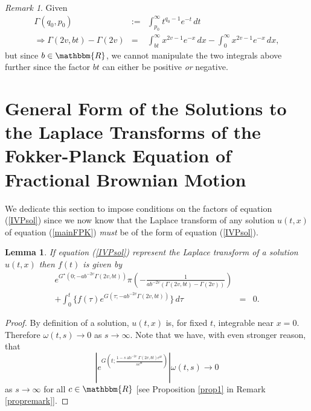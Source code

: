 \documentclass[preprint, 12pt]{elsarticle}
\numberwithin{equation}{section}
\theoremstyle{plain}
\newtheorem{lemma}{Lemma}[section]
\theoremstyle{remark}
\newtheorem{remark}{Remark}[section]
\newcommand{\assign}{:=}
\newcommand{\nocomma}{}
\newcommand{\tmop}[1]{\ensuremath{\operatorname{#1}}}
\begin{document}
\begin{remark}
Given
\begin{eqnarray*}
\Gamma (q_0, p_0) & \assign & \int_{p_0}^{\infty} t^{q_0 - 1} e^{- t}\, d t\\
\Longrightarrow \Gamma (2 v \nocomma, b t) - \Gamma (2 v \nocomma)
& = & \int_{b t}^{\infty} x^{2 v - 1} e^{- x}\, d x - \int_0^{\infty} x^{2 v - 1} e^{- x}\, d x,
\end{eqnarray*}
but since $b \in \mathbbm{R}$, we cannot manipulate the two integrals above further since the factor $b t$ can either be positive {\emph{or}} negative.
\end{remark} 


\section{General Form of the Solutions to the Laplace Transforms of the Fokker-Planck Equation of Fractional Brownian Motion}\label{proofs}

We dedicate this section to impose conditions on the factors of equation (\ref{IVPsol}) since we now know that the Laplace transform of any solution $u (t, x)$ of equation (\ref{mainFPK}) {\emph{must}} be of the form of equation (\ref{IVPsol}).

\begin{lemma} \label{lemma2}
If equation (\ref{IVPsol}) represent the Laplace transform of a solution $u (t, x)$ then $f (t)$ is given by
\begin{eqnarray*}
e^{G^{\star} \left(0 ; - a b^{- 2 v} \Gamma (2 v \nocomma, bt)\right)} \pi \left( - \frac{1}{a b^{- 2 v}  (\Gamma (2 v \nocomma, b t) - \Gamma (2 v \nocomma))} \right) & & \\ 
+ \int_0^t \{ f (\tau) e^{G (\tau ; - a b^{- 2 v} \Gamma (2 v, b t))} \}\, d \tau & = & 0.
\end{eqnarray*}
\end{lemma}

\begin{proof}
By definition of a solution, $u (t, x)$ is, for fixed $t$, integrable near $x = 0$. Therefore $\omega (t, s) \rightarrow 0$ as $s \rightarrow \infty$. Note that we have, with even stronger reason, that
\[ \left| e^{G \left( t ; \frac{1 - s \tmop{ab}^{- 2 v} \Gamma (2 v, b t) e^{b t}}{s e^{bt}} \right)} \right| \omega (t, s) \rightarrow 0 \]
as $s \rightarrow \infty$ for all $c \in \mathbbm{R}$ [see Proposition \ref{prop1} in Remark \ref{propremark}].
\end{proof}
\end{document}
